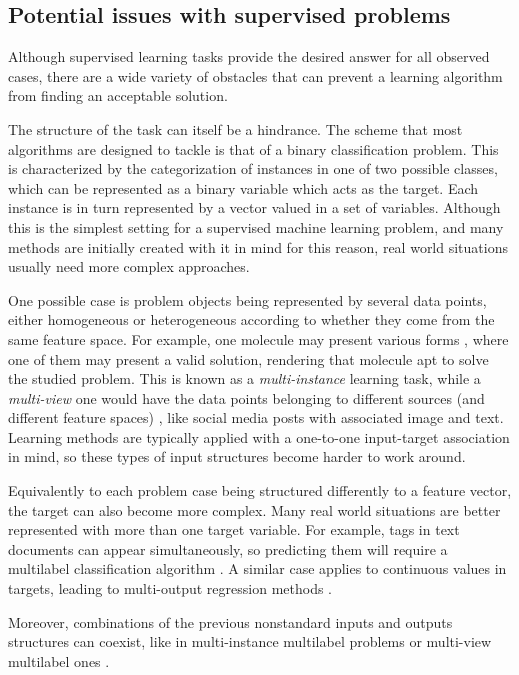 \subsection{Potential issues with supervised problems}

Although supervised learning tasks provide the desired answer for all observed cases, there are a wide variety of obstacles that can prevent a learning algorithm from finding an acceptable solution.

The structure of the task can itself be a hindrance. The scheme that most algorithms are designed to tackle is that of a binary classification problem. This is characterized by the categorization of instances in one of two possible classes, which can be represented as a binary variable which acts as the target. Each instance is in turn represented by a vector valued in a set of variables. Although this is the simplest setting for a supervised machine learning problem, and many methods are initially created with it in mind for this reason, real world situations usually need more complex approaches.

One possible case is problem objects being represented by several data points, either homogeneous or heterogeneous according to whether they come from the same feature space. For example, one molecule may present various forms , where one of them may present a valid solution, rendering that molecule apt to solve the studied problem. This is known as a \textit{multi-instance} learning task, while a \textit{multi-view} one would have the data points belonging to different sources (and different feature spaces) , like social media posts with associated image and text. Learning methods are typically applied with a one-to-one input-target association in mind, so these types of input structures become harder to work around.

Equivalently to each problem case being structured differently to a feature vector, the target can also become more complex. Many real world situations are better represented with more than one target variable. For example, tags in text documents can appear simultaneously, so predicting them will require a multilabel classification algorithm . A similar case applies to continuous values in targets, leading to multi-output regression methods .

Moreover, combinations of the previous nonstandard inputs and outputs structures can coexist, like in multi-instance multilabel problems  or multi-view multilabel ones .

